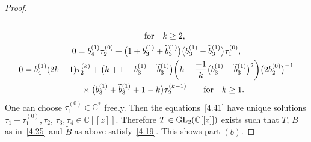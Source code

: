 \documentclass[10pt,a4paper]{amsart}
\numberwithin{equation}{section}
\numberwithin{figure}{section}
\newcommand{\C}{{\mathbb C}}
\newcommand{\www}{\widetilde}
\begin{document}
\begin{proof}
\begin{gather}
\\
\qquad\text{for}\quad k\geq 2,\nonumber
\\
0= b_4^{(1)}\tau_2^{(0)}+\big(1+b_3^{(1)}+\www b_3^{(1)}\big)
\big(b_3^{(1)}-\www b_3^{(1)}\big)\tau_1^{(0)},\nonumber
\\
0= b_4^{(1)}(2k+1)\tau_2^{(k)}+
\big(k+1+b_3^{(1)}+\www b_3^{(1)}\big)\bigg(k+\frac{-1}{k}\big(b_3^{(1)}-\www b_3^{(1)}\big)^2\bigg)\big(2b_2^{(0)}\big)^{-1}
\nonumber
\\ \hphantom{0=}
{}\times\big(b_3^{(1)}+\www b_3^{(1)}+1-k\big)\tau_2^{(k-1)}
\qquad\text{for}\quad k\geq 1.
\label{4.41}
\end{gather}
One can choose $\tau_1^{(0)}\in\C^*$ freely.
Then the equations~\eqref{4.41} have unique
solutions $\tau_1-\tau_1^{(0)},\tau_2$, $\tau_3,\tau_4\in\C[[z]]$.
Therefore $T\in {\rm GL}_2(\C[[z]])$ exists such that $T$,
$B$ as in~\eqref{4.25} and $\www B$ as above satisfy~\eqref{4.19}. This shows part $(b)$.
\end{proof}
\end{document}
